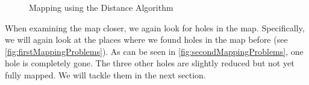 \documentclass[twoside, 12pt]{article}
\begin{document}
\begin{figure}
\vspace{0pt}
  \begin{center}
  \end{center}
\vspace{-20pt}
  \caption{Mapping using the Distance Algorithm}
  \label{fig:secondMapping}
\vspace{20pt}
\end{figure}

\begin{figure}
\vspace{-50pt}
\end{figure}

When examining the map closer, we again look for holes in the map. Specifically, we will again look at the places where we found holes in the map before (see \autoref{fig:firstMappingProblems}). As can be seen in \autoref{fig:secondMappingProblems}, one hole is completely gone. The three other holes are slightly reduced but not yet fully mapped. We will tackle them in the next section.\\
\end{document}
